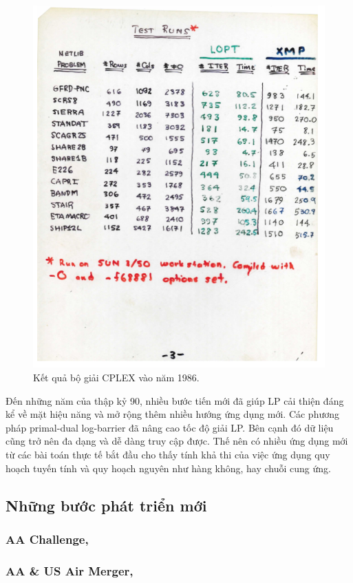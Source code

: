 \begin{figure}[h!]
    \includegraphics[width=0.85\linewidth]{figures/cplex_1986.png}
    \caption{Kết quả bộ giải CPLEX vào năm 1986.}
    \label{fig:cplex_1986}
\end{figure}

Đến những năm của thập kỷ 90, nhiều bước tiến mới đã giúp LP cải thiện đáng kể về mặt hiệu năng và mở rộng thêm nhiều hướng ứng dụng mới. Các phương pháp primal-dual log-barrier đã nâng cao tốc độ giải LP. Bên cạnh đó dữ liệu cũng trở nên đa dạng và dễ dàng truy cập được. Thế nên có nhiều ứng dụng mới từ các bài toán thực tế bắt đầu cho thấy tính khả thi của việc ứng dụng quy hoạch tuyến tính và quy hoạch nguyên như hàng không, hay chuỗi cung ứng.

\subsection{Những bước phát triển mới}

\subsubsection{AA Challenge,}

\subsubsection{AA \& US Air Merger,}


